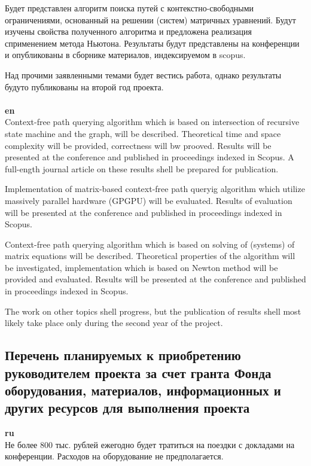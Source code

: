 \documentclass[12pt]{article}  %
\theoremstyle{remark}
\begin{document}
Будет представлен алгоритм поиска путей с контекстно-свободными ограничениями, основанный на решении (систем) матричных уравнений.
Будут изучены свойства полученного алгоритма и предложена реализация сприменением метода Ньютона.
Результаты будут представлены на конференции и опубликованы в сборнике материалов, индексируемом в scopus.

Над прочими заявленными темами будет вестись работа, однако результаты будуто публикованы на второй год проекта.
\\
\\
\textbf{en}\\
Context-free path querying algorithm which is based on intersection of recursive state machine and the graph, will be described.
Theoretical time and space complexity will be provided, correctness will bw prooved.
Results will be presented at the conference and published in proceedings indexed in Scopus.
A full-ength journal article on these results shell be prepared for publication.

Implementation of matrix-based context-free path queryig algorithm which utilize massively parallel hardware (GPGPU) will be evaluated.
Results of evaluation will be presented at the conference and published in proceedings indexed in Scopus.

Context-free path querying algorithm which is based on solving of (systems) of matrix equations will be described.
Theoretical properties of the algorithm will be investigated, implementation which is based on Newton method will be provided and evaluated.
Results will be presented at the conference and published in proceedings indexed in Scopus.

The work on other topics shell progress, but the publication of results shell most likely take place only during the second year of the project.

\subsection{Перечень планируемых к приобретению руководителем проекта за счет гранта Фонда оборудования, материалов, информационных и других ресурсов для выполнения проекта}

\textbf{ru}\\
%
Не более 800 тыс. рублей ежегодно будет тратиться на поездки с докладами на конференции. Расходов на оборудование не предполагается.
\end{document}
